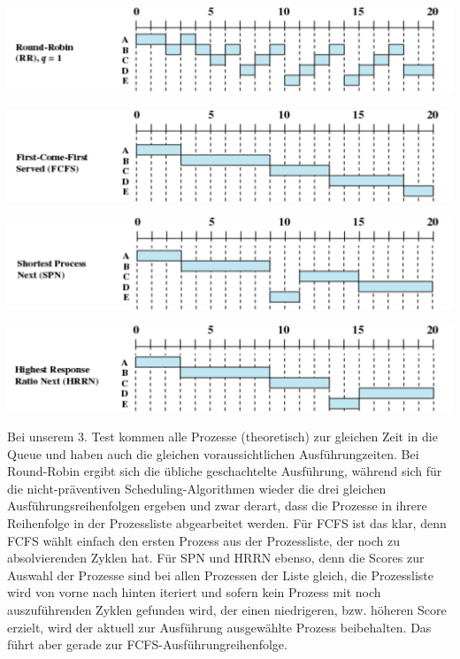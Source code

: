 \documentclass[numbers=noendperiod]{scrartcl}
\begin{document}
\begin{minipage}{0.8 \textwidth}
\includegraphics[width=\textwidth]{rr.pdf}
\end{minipage}
\newline

\begin{minipage}{0.8 \textwidth}
\includegraphics[width=\textwidth]{fcfs.pdf}
\end{minipage}
\newline

\begin{minipage}{0.8 \textwidth}
\includegraphics[width=\textwidth]{spn.pdf}
\end{minipage}
\newline

\begin{minipage}{0.8 \textwidth}
\includegraphics[width=\textwidth]{hrrn.pdf}
\end{minipage}
\newline

Bei unserem 3. Test kommen alle Prozesse (theoretisch) zur gleichen Zeit in die Queue und haben auch die gleichen voraussichtlichen Ausführungzeiten. Bei Round-Robin ergibt sich die übliche geschachtelte Ausführung, während sich für die nicht-präventiven Scheduling-Algorithmen wieder die drei gleichen Ausführungsreihenfolgen ergeben und zwar derart, dass die Prozesse in ihrere Reihenfolge in der Prozessliste abgearbeitet werden. Für FCFS ist das klar, denn FCFS wählt einfach den ersten Prozess aus der Prozessliste, der noch zu absolvierenden Zyklen hat. Für SPN und HRRN ebenso, denn die Scores zur Auswahl der Prozesse sind bei allen Prozessen der Liste gleich, die Prozessliste wird von vorne nach hinten iteriert und sofern kein Prozess mit noch auszuführenden Zyklen gefunden wird, der einen niedrigeren, bzw. höheren Score erzielt, wird der aktuell zur Ausführung ausgewählte Prozess beibehalten. Das führt aber gerade zur FCFS-Ausführungreihenfolge.
\end{document}
